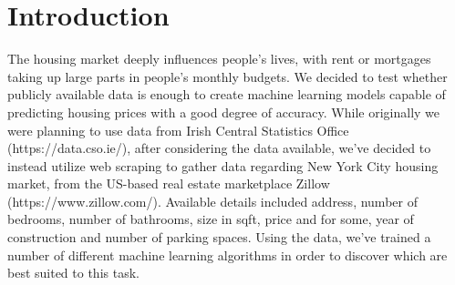 \documentclass[12pt, a4paper, twoside]{article}%
\title{\mytitle}
\author{Tommy O.}
\begin{document}
\maketitle




\section{Introduction}
The housing market deeply influences people's lives, with rent or mortgages taking up large parts in people’s monthly budgets. We decided to test whether publicly available data is enough to create machine learning models capable of predicting housing prices with a good degree of accuracy. While originally we were planning to use data from Irish Central Statistics Office (https://data.cso.ie/), after considering the data available, we’ve decided to instead utilize web scraping to gather data regarding New York City housing market, from the US-based real estate marketplace Zillow (https://www.zillow.com/).
Available details included address, number of bedrooms, number of bathrooms, size in sqft, price and for some, year of construction and number of parking spaces. Using the data, we’ve trained a number of different machine learning algorithms in order to discover which are best suited to this task.
\end{document}
